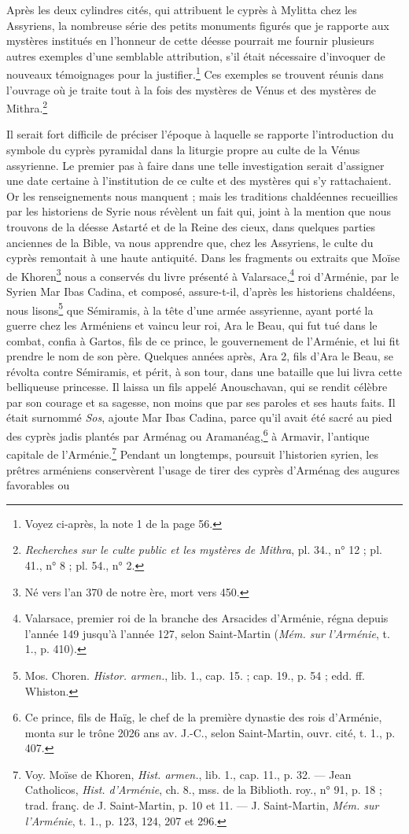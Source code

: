 \documentclass[a4paper, 11pt, oneside, polutonikogreek, french]{article}
\begin{document}
Après les deux cylindres cités, qui attribuent le cyprès à Mylitta chez les Assyriens, la nombreuse série des petits monuments figurés que je rapporte aux mystères institués en l'honneur de cette déesse pourrait me fournir plusieurs autres exemples d'une semblable attribution, s'il était nécessaire d'invoquer de nouveaux témoignages pour la justifier.\footnote{Voyez ci-après, la note 1 de la page 56.} Ces exemples se trouvent réunis dans l'ouvrage où je traite tout à la fois des mystères de Vénus et des mystères de Mithra.\footnote{\emph{Recherches sur le culte public et les mystères de Mithra}, pl. 34., n° 12 ; pl. 41., n° 8 ; pl. 54., n° 2.}

Il serait fort difficile de préciser l'époque à laquelle se rapporte l'introduction du symbole du cyprès pyramidal dans la liturgie propre au culte de la Vénus assyrienne. Le premier pas à faire dans une telle investigation serait d'assigner une date certaine à l'institution de ce culte et des mystères qui s'y rattachaient. Or les renseignements nous manquent ; mais les traditions chaldéennes recueillies par les historiens de Syrie nous révèlent un fait qui, joint à la mention que nous trouvons de la déesse Astarté et de la Reine des cieux, dans quelques parties anciennes de la Bible, va nous apprendre que, chez les Assyriens, le culte du cyprès remontait à une haute antiquité. Dans les fragments ou extraits que Moïse de Khoren\footnote{Né vers l'an 370 de notre ère, mort vers 450.} nous a conservés du livre présenté à Valarsace,\footnote{Valarsace, premier roi de la branche des Arsacides d'Arménie, régna depuis l'année 149 jusqu'à l'année 127, selon Saint-Martin (\emph{Mém. sur l'Arménie}, t. 1., p. 410).} roi d'Arménie, par le Syrien Mar Ibas Cadina, et composé, assure-t-il, d'après les historiens chaldéens, nous lisons\footnote{Mos. Choren. \emph{Histor. armen.}, lib. 1., cap. 15. ; cap. 19., p. 54 ; edd. ff. Whiston.} que Sémiramis, à la tête d'une armée assyrienne, ayant porté la guerre chez les Arméniens et vaincu leur roi, Ara le Beau, qui fut tué dans le combat, confia à Gartos, fils de ce prince, le gouvernement de l'Arménie, et lui fit prendre le nom de son père. Quelques années après, Ara 2, fils d'Ara le Beau, se révolta contre Sémiramis, et périt, à son tour, dans une bataille que lui livra cette belliqueuse princesse. Il laissa un fils appelé Anouschavan, qui se rendit célèbre par son courage et sa sagesse, non moins que par ses paroles et ses hauts faits. Il était surnommé \emph{Sos}, ajoute Mar Ibas Cadina, parce qu'il avait été sacré au pied des cyprès jadis plantés par Arménag ou Aramanéag,\footnote{Ce prince, fils de Haïg, le chef de la première dynastie des rois d'Arménie, monta sur le trône 2026 ans av. J.-C., selon Saint-Martin, ouvr. cité, t. 1., p. 407.} à Armavir, l'antique capitale de l'Arménie.\footnote{Voy. Moïse de Khoren, \emph{Hist. armen.}, lib. 1., cap. 11., p. 32. --- Jean Catholicos, \emph{Hist. d'Arménie}, ch. 8., mss. de la Biblioth. roy., n° 91, p. 18 ; trad. franç. de J. Saint-Martin, p. 10 et 11. --- J. Saint-Martin, \emph{Mém. sur l'Arménie}, t. 1., p. 123, 124, 207 et 296.} Pendant un longtemps, poursuit l'historien syrien, les prêtres arméniens conservèrent l'usage de tirer des cyprès d'Arménag des augures favorables ou 
\end{document}
